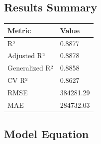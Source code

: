 \documentclass[
]{article}
\begin{document}
\subsection{Results Summary}\label{results-summary}

{\def\LTcaptype{} %
\begin{longtable}[]{@{}ll@{}}
\toprule\noalign{}
Metric & Value \\
\midrule\noalign{}
\endhead
\bottomrule\noalign{}
\endlastfoot
R² & 0.8877 \\
Adjusted R² & 0.8878 \\
Generalized R² & 0.8858 \\
CV R² & 0.8627 \\
RMSE & 384281.29 \\
MAE & 284732.03 \\
\end{longtable}
}

\subsection{Model Equation}\label{model-equation}
\end{document}

